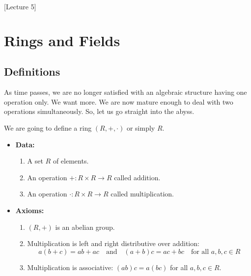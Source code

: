 [Lecture 5]


\section{Rings and Fields}

\subsection{Definitions}

As time passes, we are no longer satisfied with an algebraic structure having one operation only.
We want more.
We are now mature enough to deal with two operations simultaneously.
So, let us go straight into the abyss.

\begin{definition}
We are going to define a ring $(R, +, \cdot)$ or simply $R$.
\begin{itemize}
\item\textbf{Data:} 
\begin{enumerate}
\item A set $R$ of elements.

\item An operation $+ \colon R\times R\to R$ called addition.

\item An operation $\cdot \colon R\times R\to R$ called multiplication.
\end{enumerate}

\item\textbf{Axioms:}
\begin{enumerate}
\item $(R, +)$ is an abelian group.

\item Multiplication is left and right distributive over addition:
\[
a(b + c) = ab + ac \quad\text{and}\quad (a + b) c = ac + bc\quad \text{for all  }a, b, c\in R
\]

\item Multiplication is associative: $(ab)c = a(bc)$ for all $a, b, c\in R$.


\end{enumerate}
\end{itemize}
\end{definition}
